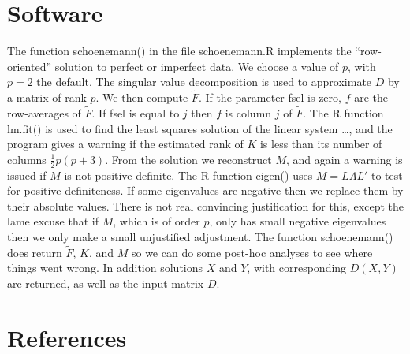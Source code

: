 \documentclass[
  12pt,
  letterpaper,
  DIV=11,
  numbers=noendperiod]{scrartcl}
\newcommand{\sectionbreak}{\clearpage}
\begin{document}
\sectionbreak

\section{Software}\label{software}

The function schoenemann() in the file schoenemann.R implements the
``row-oriented'' solution to perfect or imperfect data. We choose a
value of \(p\), with \(p = 2\) the default. The singular value
decomposition is used to approximate \(D\) by a matrix of rank \(p\). We
then compute \(\tilde F\). If the parameter fsel is zero, \(f\) are the
row-averages of \(\tilde F\). If fsel is equal to \(j\) then \(f\) is
column \(j\) of \(\tilde F\). The R function lm.fit() is used to find
the least squares solution of the linear system \ldots, and the program
gives a warning if the estimated rank of \(K\) is less than its number
of columns \(\frac12 p(p + 3)\). From the solution we reconstruct \(M\),
and again a warning is issued if \(M\) is not positive definite. The R
function eigen() uses \(M = L\Lambda L'\) to test for positive
definiteness. If some eigenvalues are negative then we replace them by
their absolute values. There is not real convincing justification for
this, except the lame excuse that if \(M\), which is of order \(p\),
only has small negative eigenvalues then we only make a small
unjustified adjustment. The function schoenemann() does return
\(\tilde F\), \(K\), and \(M\) so we can do some post-hoc analyses to
see where things went wrong. In addition solutions \(X\) and \(Y\), with
corresponding \(D(X,Y)\) are returned, as well as the input matrix
\(D\).

\sectionbreak

\section*{References}\label{references}
\end{document}
